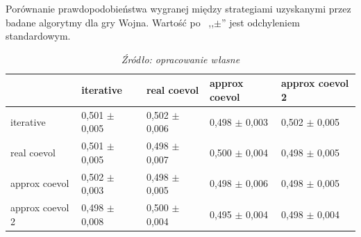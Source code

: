 \documentclass[inzynierska]{pwr_wmat_praca_dyplomowa}
\theoremstyle{plain}
\numberwithin{theorem}{chapter}
\theoremstyle{definition}
\numberwithin{theorem}{chapter}
\begin{document}
	\begin{table}
		\begin{center}
			\caption{Porównanie prawdopodobieństwa wygranej między strategiami uzyskanymi przez badane algorytmy dla gry Wojna. Wartość po  ,,$\pm$'' jest odchyleniem standardowym.}
			\small
			\begin{tabular}{lllll}
				\toprule
				{} &        iterative &      real coevol &    approx coevol &  approx coevol 2 \\
				\midrule
				iterative       &  0,501 $\pm$ 0,005 &  0,502 $\pm$ 0,006 &  0,498 $\pm$ 0,003 &  0,502 $\pm$ 0,005 \\
				real coevol     &  0,501 $\pm$ 0,005 &  0,498 $\pm$ 0,007 &    0,500 $\pm$ 0,004 &  0,498 $\pm$ 0,005 \\
				approx coevol   &  0,502 $\pm$ 0,003 &  0,498 $\pm$ 0,005 &  0,498 $\pm$ 0,006 &  0,498 $\pm$ 0,005 \\
				approx coevol 2 &  0,498 $\pm$ 0,008 &    0,500 $\pm$ 0,004 &  0,495 $\pm$ 0,004 &  0,498 $\pm$ 0,004 \\
				\bottomrule
			\end{tabular}
			\caption*{\textit{Źródło: opracowanie własne}}
			\label{table:war_results_all}
		\end{center}
	\end{table}
	
\end{document}
